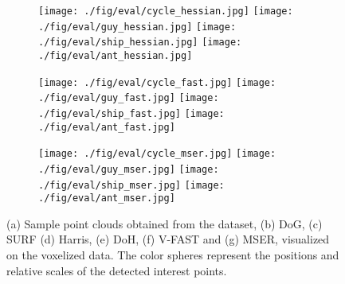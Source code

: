 \begin{figure}[ht]
\begin{subfigure}[t]{1\linewidth}
		\label{fig/eval/mesh/hessian}	
		\makebox[0.15\linewidth]{\raisebox{0.07\linewidth}{(e) DoH}} 
		\texttt{[image: ./fig/eval/cycle\_hessian.jpg]} 
		\texttt{[image: ./fig/eval/guy\_hessian.jpg]} 
		\texttt{[image: ./fig/eval/ship\_hessian.jpg]}
		\texttt{[image: ./fig/eval/ant\_hessian.jpg]} 
	\end{subfigure}
	\begin{subfigure}[t]{1\linewidth} \centering 
		\label{fig/eval/mesh/fast}	
		\makebox[0.15\linewidth]{\raisebox{0.07\linewidth}{(f) VFAST}} 
		\texttt{[image: ./fig/eval/cycle\_fast.jpg]} 
		\texttt{[image: ./fig/eval/guy\_fast.jpg]} 
		\texttt{[image: ./fig/eval/ship\_fast.jpg]}
		\texttt{[image: ./fig/eval/ant\_fast.jpg]} 
	\end{subfigure}
	\begin{subfigure}[t]{1\linewidth} \centering 
		\label{fig/eval/mesh/mser}	
		\makebox[0.15\linewidth]{\raisebox{0.07\linewidth}{(g) MSER}} 
		\texttt{[image: ./fig/eval/cycle\_mser.jpg]} 
		\texttt{[image: ./fig/eval/guy\_mser.jpg]} 
		\texttt{[image: ./fig/eval/ship\_mser.jpg]}
		\texttt{[image: ./fig/eval/ant\_mser.jpg]} 
	\end{subfigure}
	\caption{(a) Sample point clouds obtained from the \meshset dataset, (b) DoG, (c) SURF (d) Harris, (e) DoH, (f) V-FAST and (g) MSER, visualized on the voxelized data. The color spheres represent the positions and relative scales of the detected interest points.}
	\label{fig/eval/mesh}
\end{figure}

